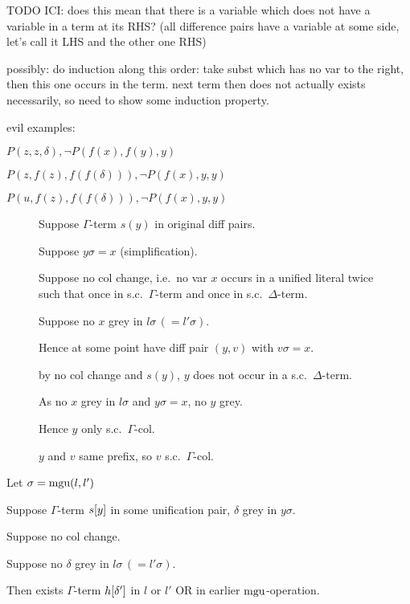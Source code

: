 \documentclass[,%
	paper=a4,%
	DIV11, %
	twoside=false,%
	liststotoc,
	bibtotoc,
	draft=false,%
	numbers=noendperiod
]{scrartcl}
\begin{document}
{TODO ICI: does this mean that there is a variable which does not have a variable in a term at its RHS? }
(all difference pairs have a variable at some side, let's call it LHS and the other one RHS)

{possibly: do induction along this order: take subst which has no var to the right, then this one occurs in the term. next term then does not actually exists necessarily, so need to show some induction property.}


evil examples:

$P(z, z, \delta), \lnot P(f(x), f(y), y)$

$P(z, f(z), f(f(\delta))), \lnot P(f(x), y, y)$

$P(u, f(z), f(f(\delta))), \lnot P(f(x), y, y)$

\begin{figure}
	\begin{clemma}
		Suppose $\Gamma$-term $s(y)$ in original diff pairs.

		Suppose $y\sigma = x$ (simplification).

		Suppose no col change, i.e.\ no var $x$ occurs in a unified literal twice such that once in s.c.\ $\Gamma$-term and once in s.c.\ $\Delta$-term.

		Suppose no $x$ grey in $l\sigma \, ( = l'\sigma )$.

		Hence at some point have diff pair $(y, v)$ with $v\sigma = x$.

		by no col change and $s(y)$, $y$ does not occur in a s.c.\ $\Delta$-term.

		As no $x$ grey in $l\sigma$ and $y\sigma = x$, no $y$ grey.

		Hence $y$ only s.c.\ $\Gamma$-col.

		$y$ and $v$ same prefix, so $v$ s.c.\ $\Gamma$-col.

	\end{clemma}


\end{figure}

\begin{clemma}
	Let $\sigma = \operatorname{mgu}(l, l')$

	Suppose $\Gamma$-term $s[y]$ in some unification pair, $\delta$ grey in $y\sigma$.

	Suppose no col change.

	Suppose no $\delta$ grey in $l\sigma \, ( = l'\sigma )$.

	Then exists $\Gamma$-term $h[\delta']$ in $l$ or $l'$ OR in earlier $\operatorname{mgu}$-operation.

\end{clemma}
\end{document}
